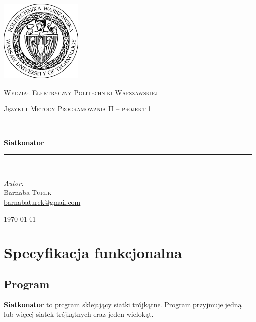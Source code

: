 \documentclass[a4paper]{article}
\newcommand{\HRule}{\rule{\linewidth}{0.5mm}}
\newcommand{\siatkonator}{\textbf{Siatkonator} }
\begin{document}
\begin{titlepage}

  \begin{center}


    \includegraphics[width=0.3\textwidth]{logo.jpg}\\[1cm]

    \begin{onehalfspace}
      \textsc{\LARGE Wydział Elektryczny Politechniki Warszawskiej}\\[1.5cm]
    \end{onehalfspace}



    \textsc{Języki i~Metody Programowania II -- projekt 1}\\[0.5cm]

    \HRule \\[0.4cm]
    {\huge \bfseries Siatkonator }\\[0.2cm]
    \HRule \\[1.5cm]

    \begin{flushleft} \large
      \emph{Autor:}\\
      Barnaba \textsc{Turek}\\
      \href{mailto:barnabaturek@gmail.com}{barnabaturek@gmail.com}
    \end{flushleft}
    \vfill

    {\large \today}

  \end{center}

\end{titlepage}
\sloppy

\setcounter{tocdepth}{4}
\tableofcontents

\section{Specyfikacja funkcjonalna}
\subsection{Program}
\siatkonator to program sklejający siatki trójkątne.
Program przyjmuje jedną lub więcej siatek trójkątnych oraz jeden wielokąt.
\end{document}
